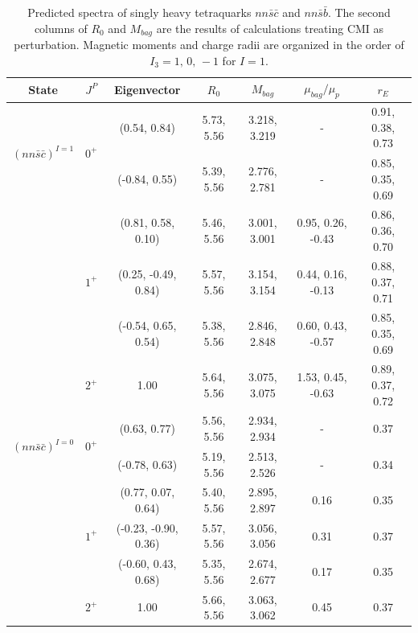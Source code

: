 \documentclass[prd,twocolumn,floatfix,nofootinbib]{revtex4}
\begin{document}
\renewcommand{\tabcolsep}{0.51cm}
\renewcommand{\arraystretch}{1.3}
\begin{table}[!htbp]
    \caption{Predicted spectra of singly heavy tetraquarks $nn\bar{s}\bar{c}$ and $nn\bar{s}\bar{b}$. 
    The second columns of $R_{0}$ and $M_{bag}$ are the results of calculations treating CMI as perturbation. 
    Magnetic moments and charge radii are organized in the order of $I_{3}=1,\,0,\,-1$ for $I=1$.}
    \label{tab:1heavytetraquark}
    \begin{tabular}{ccccccc}
        \hline\hline
        {\rm State}     &$J^{P}$    &{\rm Eigenvector}      &$R_{0}$        &$M_{bag}$          &$\mu_{bag}/\mu_{p}$    &$r_{E}$ \\ \hline
        \multirow{2}{*}{${(nn\bar{s}\bar{c})}^{I=1}$}
                        &\multirow{2}{*}{$0^{+}$}
                                    &(0.54, 0.84)           &5.73, 5.56	    &3.218, 3.219	    &-                      &0.91, 0.38, 0.73 \\
                        &           &(-0.84, 0.55)          &5.39, 5.56	    &2.776, 2.781	    &-                      &0.85, 0.35, 0.69 \\
                        &\multirow{3}{*}{$1^{+}$}
                                    &(0.81, 0.58, 0.10)     &5.46, 5.56	    &3.001, 3.001	    &0.95, 0.26, -0.43      &0.86, 0.36, 0.70 \\
                        &           &(0.25, -0.49, 0.84)    &5.57, 5.56	    &3.154, 3.154	    &0.44, 0.16, -0.13      &0.88, 0.37, 0.71 \\
                        &           &(-0.54, 0.65, 0.54)    &5.38, 5.56	    &2.846, 2.848	    &0.60, 0.43, -0.57      &0.85, 0.35, 0.69 \\
                        &$2^{+}$    &1.00                   &5.64, 5.56	    &3.075, 3.075	    &1.53, 0.45, -0.63      &0.89, 0.37, 0.72 \\
        \multirow{2}{*}{${(nn\bar{s}\bar{c})}^{I=0}$}
                        &\multirow{2}{*}{$0^{+}$}
                                    &(0.63, 0.77)           &5.56, 5.56	    &2.934, 2.934	    &-                      &0.37 \\
                        &           &(-0.78, 0.63)          &5.19, 5.56	    &2.513, 2.526	    &-                      &0.34 \\
                        &\multirow{3}{*}{$1^{+}$}
                                    &(0.77, 0.07, 0.64)     &5.40, 5.56	    &2.895, 2.897	    &0.16                   &0.35 \\
                        &           &(-0.23, -0.90, 0.36)   &5.57, 5.56	    &3.056, 3.056	    &0.31                   &0.37 \\
                        &           &(-0.60, 0.43, 0.68)    &5.35, 5.56	    &2.674, 2.677	    &0.17                   &0.35 \\
                        &$2^{+}$    &1.00                   &5.66, 5.56	    &3.063, 3.062	    &0.45                   &0.37 \\


\end{tabular}
\end{table}
\end{document}
